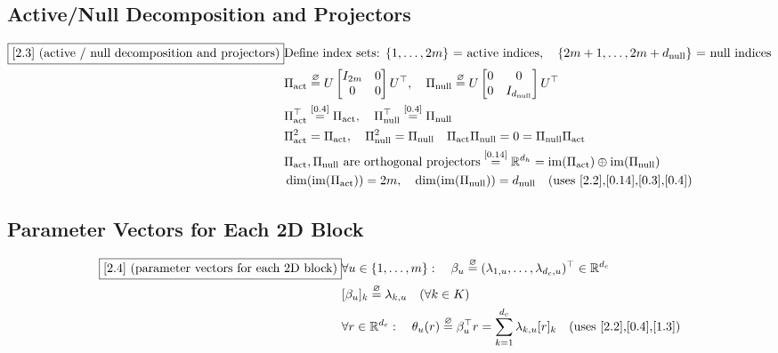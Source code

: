 \documentclass[11pt]{article}
\newcommand{\eqdef}{\overset{\varnothing}{=}}
\newcommand{\eqref}[1]{\overset{[#1]}{=}}
\begin{document}
\subsection{Active/Null Decomposition and Projectors}

\begin{align}
\boxed{[2.3] \text{ (active / null decomposition and projectors)}}
&\text{Define index sets: }
\{1,\dots,2m\}
\text{ = active indices},
\quad
\{2m+1,\dots,2m+d_{\mathrm{null}}\}
\text{ = null indices} \notag\\
&\Pi_{\mathrm{act}}
\eqdef
U
\begin{bmatrix}
I_{2m} & 0\\
0 & 0
\end{bmatrix}
U^\top
,\quad
\Pi_{\mathrm{null}}
\eqdef
U
\begin{bmatrix}
0 & 0\\
0 & I_{d_{\mathrm{null}}}
\end{bmatrix}
U^\top \notag\\
&\Pi_{\mathrm{act}}^\top
\eqref{0.4}
\Pi_{\mathrm{act}},
\quad
\Pi_{\mathrm{null}}^\top
\eqref{0.4}
\Pi_{\mathrm{null}} \notag\\
&\Pi_{\mathrm{act}}^2
=
\Pi_{\mathrm{act}},
\quad
\Pi_{\mathrm{null}}^2
=
\Pi_{\mathrm{null}}
\quad
\Pi_{\mathrm{act}}\Pi_{\mathrm{null}}
=
0
=
\Pi_{\mathrm{null}}\Pi_{\mathrm{act}} \notag\\
&\Pi_{\mathrm{act}},\Pi_{\mathrm{null}}
\text{ are orthogonal projectors}
\eqref{0.14}
\mathbb{R}^{d_h}
=
\operatorname{im}(\Pi_{\mathrm{act}})
\oplus
\operatorname{im}(\Pi_{\mathrm{null}}) \notag\\
&\dim(\operatorname{im}(\Pi_{\mathrm{act}}))
=
2m,
\quad
\dim(\operatorname{im}(\Pi_{\mathrm{null}}))
=
d_{\mathrm{null}}
\quad(\text{uses [2.2],[0.14],[0.3],[0.4]})
\end{align}

\subsection{Parameter Vectors for Each 2D Block}

\begin{align}
\boxed{[2.4] \text{ (parameter vectors for each 2D block)}}
&\forall u \in \{1,\dots,m\}:\quad
\beta_u
\eqdef
(\lambda_{1,u},\dots,\lambda_{d_c,u})^\top
\in \mathbb{R}^{d_c} \notag\\
&[\beta_u]_k
\eqdef
\lambda_{k,u}
\quad(\forall k\in K) \notag\\
&\forall r\in\mathbb{R}^{d_c}:\quad
\theta_u(r)
\eqdef
\beta_u^\top r
=
\sum_{k=1}^{d_c}
\lambda_{k,u}
[r]_k
\quad(\text{uses [2.2],[0.4],[1.3]})
\end{align}
\end{document}
